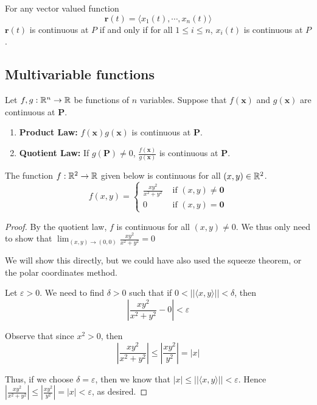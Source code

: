 \begin{proposition}
   For any vector valued function $$\bm{r}(t) = \langle x_1(t), \cdots, x_n(t) \rangle$$ 
   $\bm{r}(t)$ is continuous at $P$ if and only if for all $1 \leq i \leq n$, $x_i(t)$ is continuous at $P$.
    \end{proposition}


\subsection{Multivariable functions}

\begin{theorem}
     Let $f,g : \mathbb{R}^n \to \mathbb{R}$ be functions of $n$ variables. Suppose that $f(\bm{x})$ and $g(\bm{x})$ are continuous at $\bm{P}$.
    
    \begin{enumerate}
        \item \textbf{Product Law:} $f(\bm{x})g(\bm{x})$ is continuous at $\bm{P}$.
        \item \textbf{Quotient Law:} If $g(\bm{P})\neq 0$, $\frac{f(\bm{x})}{g(\bm{x})}$  is continuous at $\bm{P}$.
    \end{enumerate}
    
    
    \end{theorem}

    \begin{example}
    The function $f: \mathbb{R}^2 \to \mathbb{R}$ given below is continuous for all $(x,y) \in \mathbb{R}^2$. $$f(x,y) = \left\{
		\begin{array}{ll}
			\frac{xy^2}{x^2 + y^2} & \text{ if } (x,y) \neq \bm{0} \\
			0 & \text{ if } (x,y) = \bm{0}
		\end{array}
		\right.$$
		
	\begin{proof}
	By the quotient law, $f$ is continuous for all $(x,y) \neq 0$.  We thus only need to show that $\lim_{(x,y) \to (0,0)} \frac{xy^2}{x^2 + y^2} = 0$
	
	We will show this directly, but we could have also used the squeeze theorem, or the polar coordinates method.
	
	Let $\varepsilon > 0$.  We need to find $\delta > 0$ such that if $0 < ||\langle x, y \rangle|| < \delta$, then $$|\frac{xy^2}{x^2 + y^2} - 0| < \varepsilon$$
	
	Observe that since $x^2 > 0$, then $$|\frac{xy^2}{x^2 + y^2}| \leq |\frac{xy^2}{y^2}| = |x|$$
	
	Thus, if we choose $\delta = \varepsilon$, then we know that $|x| \leq ||\langle x, y \rangle|| < \varepsilon$.  Hence $|\frac{xy^2}{x^2 + y^2}| \leq |\frac{xy^2}{y^2}| = |x| < \varepsilon$, as desired.
	
	\end{proof}
		
    \end{example}

